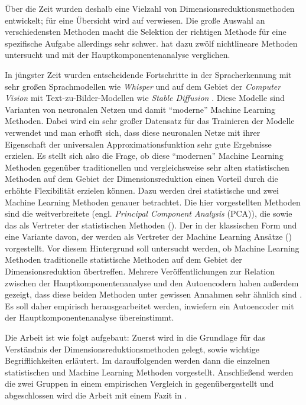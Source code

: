 Über die Zeit wurden deshalb eine Vielzahl von Dimensionsreduktionsmethoden entwickelt; für eine Übersicht wird auf \textcites{Burges.2009}{Sarveniazi.2014}{Sorzano.2014}{Cunningham.2014}{Lee.2007} verwiesen. Die große Auswahl an verschiedensten Methoden macht die Selektion der richtigen Methode für eine spezifische Aufgabe allerdings sehr schwer. \Textcite{vanderMaaten.2009} hat dazu zwölf nichtlineare Methoden untersucht und mit der Hauptkomponentenanalyse verglichen.

In jüngster Zeit wurden entscheidende Fortschritte in der Spracherkennung mit sehr großen
Sprachmodellen wie \textit{Whisper} \parencite{Radford.2022} und auf dem Gebiet der \textit{Computer Vision} mit Text-zu-Bilder-Modellen
wie \textit{Stable Diffusion} \parencite{Rombach.2021}. Diese Modelle sind Varianten von neuronalen Netzen und damit
\enquote{moderne} Machine Learning Methoden. Dabei wird ein sehr großer Datensatz für das
Trainieren der Modelle verwendet und man erhofft sich, dass diese neuronalen Netze mit ihrer
Eigenschaft der universalen Approximationsfunktion \parencites[194 -- 197]{Goodfellow.2016}{Hornik.1989} sehr gute Ergebnisse erzielen. Es stellt sich
also die Frage, ob diese \enquote{modernen} Machine Learning Methoden gegenüber traditionellen und
vergleichsweise sehr alten statistischen Methoden auf dem Gebiet der Dimensionsreduktion einen
Vorteil durch die erhöhte Flexibilität erzielen können. Dazu werden drei statistische und zwei
Machine Learning Methoden genauer betrachtet. Die hier vorgestellten Methoden sind die
weitverbreitete  (engl. \textit{Principal Component Analysis}
(PCA)), die  sowie das  als Vertreter der
statistischen Methoden (). Der  in
der klassischen Form und eine Variante davon, der  werden als
Vertreter der Machine Learning Ansätze () vorgestellt. Vor
diesem Hintergrund soll untersucht werden, ob Machine Learning Methoden traditionelle statistische
Methoden auf dem Gebiet der Dimensionsreduktion übertreffen. Mehrere Veröffentlichungen zur
Relation zwischen der Hauptkomponentenanalyse und den Autoencodern haben außerdem gezeigt, dass
diese beiden Methoden unter gewissen Annahmen sehr ähnlich sind \parencites{Baldi.1989}{Bourlard.1988}{Plaut.2018}. Es soll daher empirisch herausgearbeitet werden,
inwiefern ein Autoencoder mit der Hauptkomponentenanalyse übereinstimmt.

Die Arbeit ist wie folgt aufgebaut: Zuerst wird in  die Grundlage
für das Verständnis der Dimensionsreduktionsmethoden gelegt, sowie wichtige Begrifflichkeiten
erläutert. Im darauffolgenden  werden dann die einzelnen
statistischen und Machine Learning Methoden vorgestellt. Anschließend werden die zwei Gruppen in
einem empirischen Vergleich in  gegenübergestellt und abgeschlossen wird die
Arbeit mit einem Fazit in .